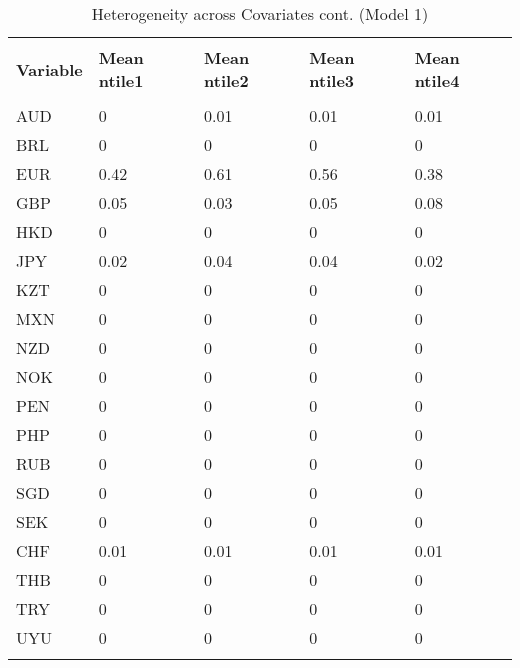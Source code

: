 \begin{table}[H]
\centering
\caption{Heterogeneity across Covariates cont. (Model 1)}
\label{Het}
\footnotesize
\begin{tabular}{lllll}
\\[-1.8ex]\hline 
\hline \\[-1.8ex] 
{\color[HTML]{333333} \textbf{Variable}} & {\color[HTML]{333333} \textbf{Mean ntile1}} & {\color[HTML]{333333} \textbf{Mean ntile2}} & {\color[HTML]{333333} \textbf{Mean ntile3}} & {\color[HTML]{333333} \textbf{Mean ntile4}} \\
\hline \\[-1.8ex] 
AUD & 0 & \cellcolor[HTML]{FBFCFE}0.01 & \cellcolor[HTML]{FBFCFE}0.01 & \cellcolor[HTML]{FBFCFE}0.01 \\
BRL & 0 & 0 & 0 & 0 \\
EUR & \cellcolor[HTML]{B3DFC0}0.42 & \cellcolor[HTML]{91D1A3}0.61 & \cellcolor[HTML]{9AD5AB}0.56 & \cellcolor[HTML]{BAE1C6}0.38 \\
GBP & \cellcolor[HTML]{F4F9F8}0.05 & \cellcolor[HTML]{F7FAFB}0.03 & \cellcolor[HTML]{F4F9F8}0.05 & \cellcolor[HTML]{EEF7F3}0.08 \\
HKD & 0 & 0 & 0 & 0 \\
JPY & \cellcolor[HTML]{F9FBFC}0.02 & \cellcolor[HTML]{F5FAF9}0.04 & \cellcolor[HTML]{F5FAF9}0.04 & \cellcolor[HTML]{F9FBFC}0.02 \\
KZT & 0 & 0 & 0 & 0 \\
MXN & 0 & 0 & 0 & 0 \\
NZD & 0 & 0 & 0 & 0 \\
NOK & 0 & 0 & 0 & 0 \\
PEN & 0 & 0 & 0 & 0 \\
PHP & 0 & 0 & 0 & 0 \\
RUB & 0 & 0 & 0 & 0 \\
SGD & 0 & 0 & 0 & 0 \\
SEK & 0 & 0 & 0 & 0 \\
CHF & \cellcolor[HTML]{FBFCFE}0.01 & \cellcolor[HTML]{FBFCFE}0.01 & \cellcolor[HTML]{FBFCFE}0.01 & \cellcolor[HTML]{FBFCFE}0.01 \\
THB & 0 & 0 & 0 & 0 \\
TRY & 0 & 0 & 0 & 0 \\
UYU & 0 & 0 & 0 & 0 \\
\hline \\[-1.8ex] 
\end{tabular}
\end{table}

\newpage

